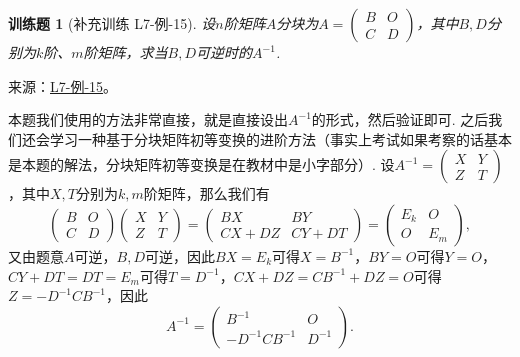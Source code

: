 \documentclass[12pt,fontset=fandol]{ctexart}
\newtheorem{exercise}{训练题}[section]
\begin{document}
\begin{exercise}[补充训练 L7-例-15]\label{prob:L7-例-15}
设$n$阶矩阵$A$分块为$A=\begin{pmatrix}
                      B & O \\ C & D
                  \end{pmatrix}$，其中$B,D$分别为$k$阶、$m$阶矩阵，求当$B,D$可逆时的$A^{-1}$.
\end{exercise}
\noindent 来源：\href{https://github.com/yhwu-is/Linear-Algebra-Left-Undone/blob/new/%E8%AE%B2%E4%B9%89/%E4%B8%93%E9%A2%98/7%20%E7%BA%BF%E6%80%A7%E6%98%A0%E5%B0%84%E7%9F%A9%E9%98%B5%E8%A1%A8%E7%A4%BA%E4%B8%8E%E7%9F%A9%E9%98%B5%E8%BF%90%E7%AE%97%E5%9F%BA%E7%A1%80.tex}{L7-例-15}。
\begin{solve}
本题我们使用的方法非常直接，就是直接设出$A^{-1}$的形式，然后验证即可. 之后我们还会学习一种基于分块矩阵初等变换的进阶方法（事实上考试如果考察的话基本是本题的解法，分块矩阵初等变换是在教材中是小字部分）. 设$A^{-1}=\begin{pmatrix}
                      X & Y \\ Z & T
                  \end{pmatrix}$，其中$X,T$分别为$k,m$阶矩阵，那么我们有
              \[\begin{pmatrix}
                      B & O \\ C & D
                  \end{pmatrix}\begin{pmatrix}
                      X & Y \\ Z & T
                  \end{pmatrix}=\begin{pmatrix}
                      BX & BY \\ CX+DZ & CY+DT
                  \end{pmatrix}=\begin{pmatrix}
                      E_k & O \\ O & E_m
                  \end{pmatrix},\]
              又由题意$A$可逆，$B,D$可逆，因此$BX=E_k$可得$X=B^{-1}$，$BY=O$可得$Y=O$，$CY+DT=DT=E_m$可得$T=D^{-1}$，$CX+DZ=CB^{-1}+DZ=O$可得$Z=-D^{-1}CB^{-1}$，因此
              \[A^{-1}=\begin{pmatrix}
                      B^{-1} & O \\ -D^{-1}CB^{-1} & D^{-1}
                  \end{pmatrix}.\]
\end{solve}
\end{document}
